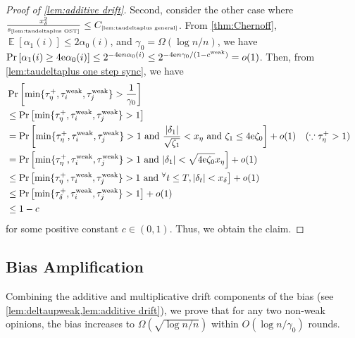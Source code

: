 \documentclass[letterpaper,11pt]{article}
\DeclarePairedDelimiter{\cbra}{\lbrace}{\rbrace} %
\DeclareMathOperator*{\E}{\mathbb{E}}
\newcommand{\e}{\mathrm{e}}
\newcommand{\constref}[1]{C_{\mbox{\tiny\ref{#1}}}}
\newcommand{\varianceref}[1]{\variance_{\mbox{\tiny\ref{#1}}}}
\newcommand{\alphanorm}{\gamma}
\newcommand{\taudeltaplus}{\tau^{+}_\delta}
\newcommand{\tauetaplus}{\tau^{+}_\eta}
\newcommand{\cweak}{c^{\mathrm{weak}}}
\newcommand{\variance}{s}
\newcommand{\taudeltadown}{\tau^{\downarrow}_\delta}
\newcommand{\tauiup}{\tau^{\uparrow}_i}
\newcommand{\tauiweak}{\tau^{\mathrm{weak}}_i}
\newcommand{\taujweak}{\tau^{\mathrm{weak}}_j}
\newcommand{\tinyforall}{{}^{\forall}}
\newcommand{\tauetaup}{\tau^{\uparrow}_\eta}
\newcommand{\xdelta}{x_{\delta}}
\newcommand{\xeta}{x_{\eta}}
\begin{document}
\begin{proof}[Proof of \cref{lem:additive drift}]
    Second, consider the other case where $\frac{\xdelta^2}{\varianceref{lem:taudeltaplus OST}}\leq \constref{lem:taudeltaplus general}$.
  From \cref{thm:Chernoff}, $\E[\alpha_1(i)]\leq 2\alpha_0(i)$, and $\alphanorm_0=\Omega(\log n/n)$, we have $\Pr\qty[\alpha_1(i)\geq 4\e\alpha_0(i)]\leq 2^{-4\e n\alpha_0(i)}\leq 2^{-4\e n\alphanorm_0/(1-\cweak)}=o(1)$.
  Then, from \cref{lem:taudeltaplus one step sync}, we have
  \begin{align*}
    &\Pr\qty[\min\{\tauetaplus,\tauiweak,\taujweak\}>\frac{1}{\alphanorm_0}]\\
    &\leq \Pr\qty[\min\{\tauetaplus,\tauiweak,\taujweak\}>1]\\
    &=\Pr\qty[\min\{\tauetaplus,\tauiweak,\taujweak\}>1\textrm{ and }
    \frac{\abs{\delta_1}}{\sqrt{\zeta_1}}< \xeta \textrm{ and } \zeta_1\leq 4\e\zeta_0]+o(1) &&(\because \tauetaplus>1)\nonumber\\
    &=\Pr\qty[\min\{\tauetaplus,\tauiweak,\taujweak\}>1\textrm{ and }
    \abs{\delta_1}< \sqrt{4\e\zeta_0}\xeta]+o(1) \nonumber\\
    &\leq \Pr\qty[\min\{\tauetaplus,\tauiweak,\taujweak\}>1\textrm{ and }\tinyforall t\leq T, \abs{\delta_t}<\xdelta] +o(1)\nonumber\\
    &\leq \Pr\qty[\min\{\taudeltaplus,\tauiweak,\taujweak\}>1]+o(1)\nonumber \\
    &\leq 1-c
  \end{align*}
  for some positive constant $c\in (0,1)$.
  Thus, we obtain the claim.
\end{proof}
  
\subsection{Bias Amplification} \label{sec:bias amplification}
Combining the additive and multiplicative drift components of the bias (see \cref{lem:deltaupweak,lem:additive drift}), 
we prove that for any two non‑weak opinions, the bias increases to \(\Omega(\sqrt{\log n / n})\) within \(O(\log n / \gamma_0)\) rounds.
\end{document}
